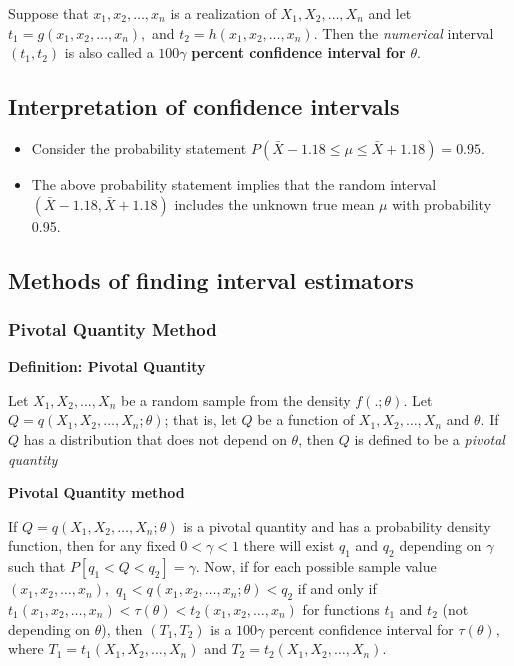 \documentclass[]{book}
\begin{document}
Suppose that \(x_1, x_2, \dots, x_n\) is a realization of \(X_1, X_2, \dots, X_n\) and let \(t_1 = g(x_1, x_2, \dots, x_n),\) and \(t_2 = h(x_1, x_2, \dots, x_n)\). Then the \emph{numerical} interval \((t_1, t_2)\) is also called a \(100\gamma\) \textbf{percent confidence interval for} \(\theta\).

\hypertarget{interpretation-of-confidence-intervals}{%
\subsection{Interpretation of confidence intervals}\label{interpretation-of-confidence-intervals}}

\begin{itemize}
\item
  Consider the probability statement \(P(\bar{X}-1.18 \leq \mu\leq \bar{X}+1.18) =0.95.\)
\item
  The above probability statement implies that the random interval \((\bar{X}-1.18, \bar{X}+1.18)\) includes the unknown true mean \(\mu\) with probability 0.95.
\end{itemize}

\newpage

\hypertarget{methods-of-finding-interval-estimators}{%
\subsection{Methods of finding interval estimators}\label{methods-of-finding-interval-estimators}}

\hypertarget{pivotal-quantity-method}{%
\subsubsection{Pivotal Quantity Method}\label{pivotal-quantity-method}}

\textbf{Definition: Pivotal Quantity}

Let \(X_1, X_2,\dots, X_n\) be a random sample from the density \(f(.;\theta).\) Let \(Q=q(X_1, X_2,\dots, X_n; \theta)\); that is, let \(Q\) be a function of \(X_1, X_2,\dots, X_n\) and \(\theta\). If \(Q\) has a distribution that does not depend on \(\theta\), then \(Q\) is defined to be a \emph{pivotal quantity}

\textbf{Pivotal Quantity method}

If \(Q=q(X_1, X_2,\dots, X_n; \theta)\) is a pivotal quantity and has a probability density function, then for any fixed \(0<\gamma<1\) there will exist \(q_1\) and \(q_2\) depending on \(\gamma\) such that \(P[q_1<Q<q_2]=\gamma.\) Now, if for each possible sample value \((x_1, x_2, \dots, x_n),\) \(q_1< q(x_1, x_2,\dots, x_n; \theta)< q_2\) if and only if \(t_1(x_1, x_2,\dots, x_n)<\tau(\theta)<t_2(x_1, x_2,\dots, x_n)\) for functions \(t_1\) and \(t_2\) (not depending on \(\theta\)), then \((T_1, T_2)\) is a \(100\gamma\) percent confidence interval for \(\tau(\theta),\) where \(T_1=t_1(X_1, X_2,\dots, X_n)\) and \(T_2=t_2(X_1, X_2,\dots, X_n)\).
\end{document}
